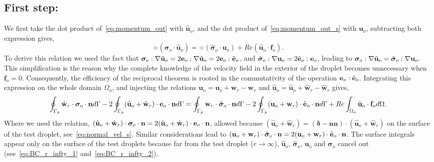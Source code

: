 \subsection{First step:}
We first take the dot product of~\ref{eq:momentum_out} with $\hat{\textbf{u}}_{o}$, and the dot product of~\ref{eq:momentum_out_s} with $\textbf{u}_{o}$, subtracting both expression gives, 
\begin{equation}
    \div (\bm\sigma_{o}\cdot \hat{\textbf{u}}_o)
    =
    \div (\hat{\bm\sigma}_{o}\cdot \textbf{u}_o)
    + Re (\hat{\textbf{u}}_{o}\cdot \textbf{f}_{o}). 
    \label{eq:first_step_out}
\end{equation}
To derive this relation we used the fact that $\bm\sigma_o :\mathbf{\nabla} \hat{\textbf{u}}_o = 2\textbf{e}_o :\mathbf{\nabla} \hat{\textbf{u}}_o = 2{\textbf e}_o : \hat{\textbf e}_o$, and  $\hat{\bm\sigma}_o :\mathbf{\nabla} {\textbf{u}}_o = 2\hat{\textbf{e}}_o : \textbf{e}_o$, leading to $\bm\sigma_o :\mathbf{\nabla} \hat{\textbf{u}}_o = \hat{\bm\sigma}_o :\mathbf{\nabla} {\textbf{u}}_o$. 
This simplification is the reason why the complete knowledge of the velocity field in the exterior of the droplet becomes unnecessary when $\textbf{f}_o = 0$.
Consequently, the  efficiency of the reciprocal theorem is rooted in the commutativity of the operation $\textbf e_o:\hat{\textbf e}_o$. 
Integrating this expression on the whole domain $\Omega_{o}$, and injecting the relations $\textbf{u}_o = \textbf{u}_o+\textbf{w}_r-\textbf{w}_r$ and $\hat{\textbf{u}}_o = \hat{\textbf{u}}_o+\hat{\textbf{w}}_r-\hat{\textbf{w}}_r$ gives, 
\begin{equation}
    \intS[p]{\hat{\textbf{w}}_{r} \cdot  \bm\sigma_{o}\cdot \textbf{n}}
    - 2\intS[p]{(\hat{\textbf{u}}_{o} + \hat{\textbf{w}}_r) \cdot  \textbf e_{o}\cdot \textbf{n}}
    =
    \intS[p]{\textbf{w}_{r}\cdot \hat{\bm\sigma}_{o}\cdot \textbf{n}}
    - 2\intS[p]{(\textbf{u}_{o} + \textbf{w}_r)\cdot \hat{\textbf e}_{o}\cdot \textbf{n}}
    + 
    Re\intO[o]{\hat{\textbf{u}}_{o}\cdot \textbf{f}_{o}}.
    \label{eq:int_first_step}
\end{equation}
Where we used the relation, $(\hat{\textbf{u}}_{o} + \hat{\textbf{w}}_r) \cdot  \bm\sigma_{o}\cdot \textbf{n} = 2 (\hat{\textbf{u}}_{o} + \hat{\textbf{w}}_r) \cdot  \textbf e_{o}\cdot \textbf{n}$, allowed  because $(\hat{\textbf{u}}_{o} + \hat{\textbf{w}}_r) = (\bm\delta - \textbf{nn})\cdot (\hat{\textbf{u}}_{o} + \hat{\textbf{w}}_r)$ on the surface of the test droplet, see~\ref{eq:normal_vel_s}. 
Similar considerations lead to $({\textbf{u}}_{o} + {\textbf{w}_r}) \cdot  \hat{\bm\sigma}_{o}\cdot \textbf{n} =2  ({\textbf{u}}_{o} + {\textbf{w}_r}) \cdot  \hat{\textbf e}_{o}\cdot \textbf{n}$. 
The surface integrals appear only on the surface of the test droplets because far from the test droplet ($r\to\infty$), $\hat{\textbf{u}}_o$, $\hat{\bm\sigma}_o$, $\textbf{u}_o$ and $\bm\sigma_o$ cancel out (see~\ref{eq:BC_r_infty_1} and~\ref{eq:BC_r_infty_2}). 

